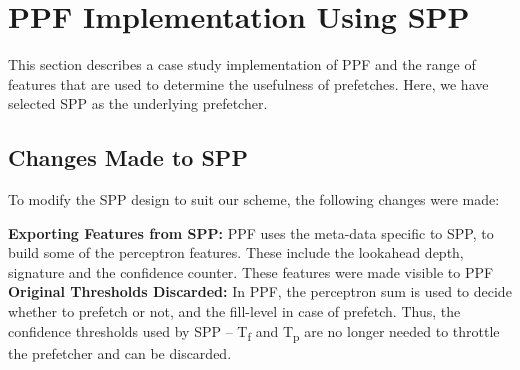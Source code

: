 \section{PPF Implementation Using SPP}
\label{Impl}

This section describes a case study implementation of PPF and the
range of features that are used to determine the usefulness of
prefetches.  Here, we have selected SPP as the underlying prefetcher.

\subsection{Changes Made to SPP}
\label{Impl-Changes}
To modify the SPP design to suit our scheme, the following changes
were made:

\noindent \textbf{Exporting Features from SPP:} PPF uses the meta-data 
specific to SPP, to build some of the perceptron features. These include
the lookahead depth, signature and the confidence counter. These features 
were made visible to PPF\\
%
\noindent \textbf{Original Thresholds Discarded:} In PPF, the
perceptron sum is used to decide whether to prefetch or not, and the
fill-level in case of prefetch.  Thus, the confidence thresholds used 
by SPP -- T\textsubscript{f} and T\textsubscript{p} are no longer needed to
throttle the prefetcher and can be discarded.
%
%
%
%
%

